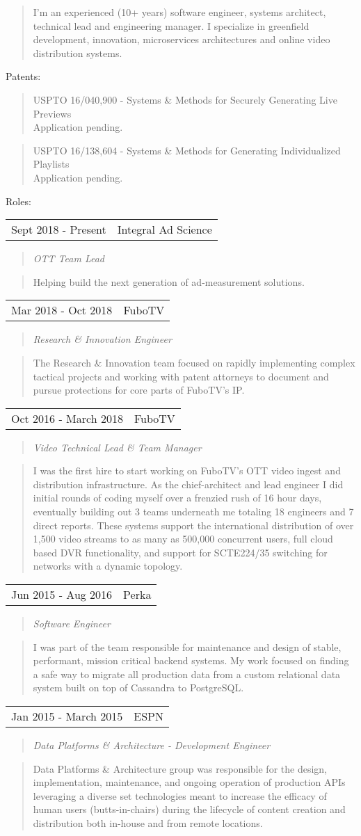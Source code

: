 \documentclass[11pt]{article}
\newcommand{\job}[5]{
  \begin{tabular}{l|l}
    #1 - #2 & #3 \\
  \end{tabular}
  \begin{quotation}
    \noindent\textit{#4}
  \end{quotation}
  \begin{quotation}
    \noindent#5
  \end{quotation} 
}
\newcommand{\pendingpatent}[2]{
  \begin{quotation}
    {\small\noindent#1 - #2}\\
    {\tiny Application pending.}
  \end{quotation}
}
\begin{document}
\begin{quotation}
  \noindent I'm an experienced (10+ years) software engineer, systems architect,
  technical lead and engineering manager. I specialize in greenfield
  development, innovation, microservices architectures and online video
  distribution systems.
\end{quotation}

\noindent Patents:

\pendingpatent{USPTO 16/040,900}{Systems \& Methods for Securely Generating Live
  Previews}

\pendingpatent{USPTO 16/138,604}{Systems \& Methods for Generating
  Individualized Playlists}

\noindent Roles:
\vspace{.1in}

\job{Sept 2018}{Present}{Integral Ad Science}{OTT Team Lead}{Helping build the
  next generation of ad-measurement solutions.}

\job{Mar 2018}{Oct 2018}{FuboTV}{Research \& Innovation Engineer}{The Research \&
  Innovation team focused on rapidly implementing complex tactical projects and
  working with patent attorneys to document and pursue protections for core
  parts of FuboTV’s IP.}

\job{Oct 2016}{March 2018}{FuboTV}{Video Technical Lead \& Team Manager}{I was the
  first hire to start working on FuboTV’s OTT video ingest and distribution
  infrastructure. As the chief-architect and lead engineer I did initial rounds
  of coding myself over a frenzied rush of 16 hour days, eventually building out
  3 teams underneath me totaling 18 engineers and 7 direct reports. These
  systems support the international distribution of over 1,500 video streams to
  as many as 500,000 concurrent users, full cloud based DVR functionality, and
  support for SCTE224/35 switching for networks with a dynamic topology.}

\job{Jun 2015}{Aug 2016}{Perka}{Software Engineer}{I was part of the team
  responsible for maintenance and design of stable, performant, mission critical
  backend systems. My work focused on finding a safe way to migrate all
  production data from a custom relational data system built on top of Cassandra
  to PostgreSQL.}

\pagebreak 

\job{Jan 2015}{March 2015}{ESPN}{Data Platforms \& Architecture - Development
  Engineer}{Data Platforms \& Architecture group was responsible for the design,
  implementation, maintenance, and ongoing operation of production APIs
  leveraging a diverse set technologies meant to increase the efficacy of human
  users (butts-in-chairs) during the lifecycle of content creation and
  distribution both in-house and from remote locations.}
\end{document}
